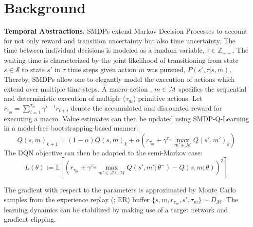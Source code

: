 \documentclass[10pt,letterpaper]{article}
\begin{document}
\section{Background}

\textbf{Temporal Abstractions.} 
SMDPs extend Markov Decision Processes to account for not only reward and transition uncertainty but also time uncertainty. The time between individual decisions is modeled as a random variable, $\tau \in \mathbb{Z}_{++}$. The waiting time is characterized by the joint likelihood of transitioning from state $s \in \mathcal{S}$ to state $s'$ in $\tau$ time steps given action $m$ was pursued, $P(s', \tau| s, m)$. Thereby, SMDPs allow one to elegantly model the execution of actions which extend over multiple time-steps. A macro-action \cite{McGovern_1997}, $m \in \mathcal{M}$ specifies the sequential and deterministic execution of multiple ($\tau_m$) primitive actions. Let $r_{\tau_m} = \sum_{i=1}^{\tau_m} \gamma^{i-1} r_{t+i}$ denote the accumulated and discounted reward for executing a macro. Value estimates can then be updated using SMDP-Q-Learning \cite{Parr_1998a} in a model-free bootstrapping-based manner:
$$Q(s, m)_{k+1} = (1-\alpha) Q(s, m)_k + \alpha \left( r_{\tau_m} + \gamma^{\tau_m} \max_{m' \in \mathcal{M}} Q(s', m')_k \right)$$  
The DQN \cite{Mnih_2015} objective can then be adapted to the semi-Markov case:
$$L(\theta) := \mathbb{E} [(r_{\tau_m} + \gamma^{\tau_m} \max_{m' \in \mathcal{A} \cup \mathcal{M}} Q(s',m';\theta^-) - Q(s,m; \theta))^2] $$

The gradient with respect to the parameters is approximated by Monte Carlo samples from the experience replay (; ER) buffer $\{s,m,r_{\tau_m},s', \tau_m\} \sim D_{\mathcal{M}}$. The learning dynamics can be stabilized by making use of a target network and gradient clipping.
\end{document}
